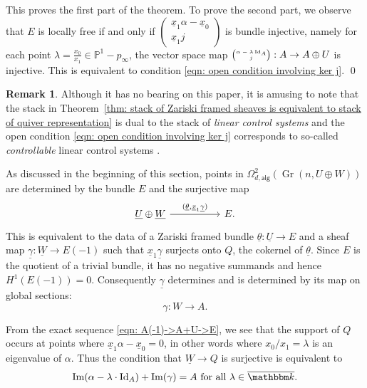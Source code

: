 \documentclass{amsart}
\theoremstyle{definition}
\newtheorem{remark}[theorem]{Remark}
\newcommand{\kk} {{\mathbbm k}}
\newcommand{\PP}{\mathbb{P}}
\newcommand{\im}{\operatorname{Im}}
\newcommand{\UL}[1]{\underline{#1}}
\newcommand{\alg}{\mathsf{alg}}
\newcommand{\Gr}{\operatorname{Gr}}
\newcommand{\LoopTwo}{\Omega^{2}_{d,\alg}}
\newcommand{\Id}{\operatorname{Id}}
\begin{document}
This proves the first part of the theorem. To prove the second part,
we observe that  $E$ is locally free if and only if
$ \left(\begin{smallmatrix} \UL{x}_{1} \alpha -\UL{x}_{0}\\ 
\UL{x}_{1}j \end{smallmatrix} \right)$ is bundle injective, namely for
each point $\lambda =\frac{x_{0}}{x_{1}}\in \PP^{1}-p_{\infty}$,
the vector space map ${\tiny \begin{pmatrix} \alpha -\lambda \Id_{A}\\
j \end{pmatrix}} : A\to A\oplus U $ is injective. This is equivalent
to condition \eqref{eqn: open condition involving ker j}.
\qed 

\begin{remark}\label{rem: linear control systems}
Although it has no bearing on this paper, it is amusing to note that
the stack in Theorem~\ref{thm: stack of Zariski framed sheaves is
equivalent to stack of quiver representation} is dual to the stack of
\emph{linear control systems} and the open condition \eqref{eqn: open
condition involving ker j} corresponds to so-called
\emph{controllable} linear control systems
\cite{Geiss-intro-to-moduli-quivers}.
\end{remark}


As discussed in the beginning of this section, points in $\LoopTwo
(\Gr (n,U\oplus W))$ are determined by the bundle $E$ and the
surjective map
\[
\begin{tikzcd}[column sep={8em,between origins}]
\UL{U}\oplus \UL{W} \arrow{r}{(\UL{\theta },\UL{x}_{1}\UL{\gamma})} &E .
\end{tikzcd}
\]
This is equivalent to the data of a Zariski framed bundle
$\UL{\theta}:\UL{U}\to E$ and a sheaf map $\UL{\gamma}:\UL{W}\to
E(-1)$ such that $\UL{x}_{1}\UL{\gamma}$ surjects onto $Q$, the
cokernel of $\UL{\theta}$. Since $E$ is the quotient of a trivial
bundle, it has no negative summands and hence
$H^{1}(E(-1))=0$. Consequently $\UL{\gamma}$ determines and is
determined by its map on global sections:
\[
\gamma :W \to A.
\]

From the exact sequence \eqref{eqn: A(-1)->A+U->E}, we see that the
support of $Q$ occurs at points where $\UL{x}_{1}\alpha
-\UL{x}_{0}=0$, in other words where $x_{0}/x_{1}=\lambda $ is an
eigenvalue of $\alpha$. Thus the condition that $\UL{W}\to Q$ is
surjective is equivalent to
\begin{equation}\label{eqn: open condition with gamma}
\im (\alpha -\lambda \cdot \Id_{A})+ \im (\gamma )=A \text{ for
all }\lambda\in \overline{\kk}.
\end{equation}
\end{document}
